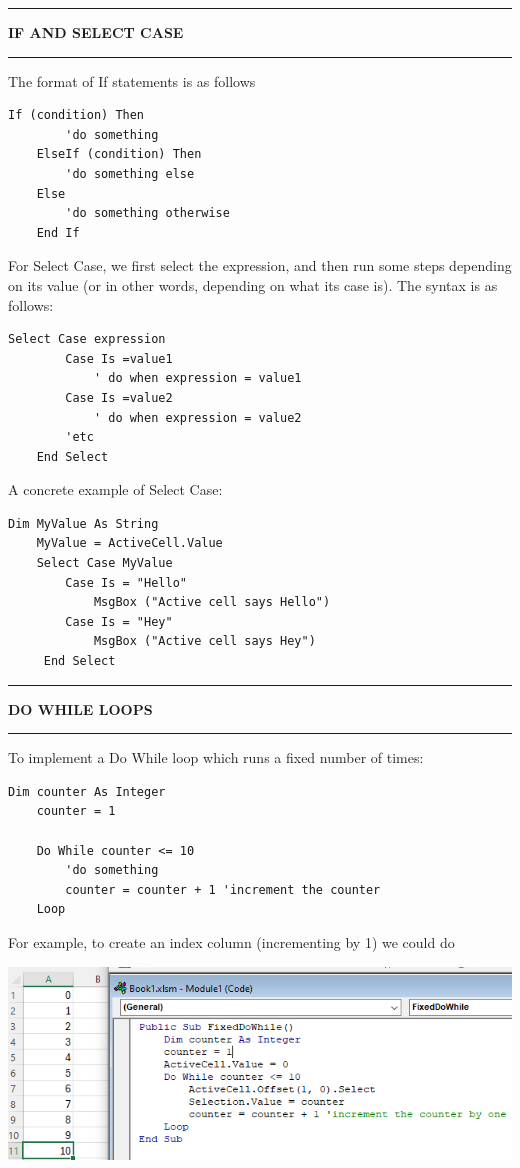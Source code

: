 \documentclass[8pt]{extarticle}
\newcommand{\heading}[1]{%
    \noindent
    \rule{\linewidth}{0.4pt}
    \begin{center}
        \vspace{-1ex}
        \textbf{#1}        
        \vspace{-2.5ex}
    \end{center}
    \rule{\linewidth}{0.4pt}
}
\begin{document}
\begin{multicols}{3}
\heading{IF AND SELECT CASE}

The format of If statements is as follows
\begin{lstlisting}[style=vba]
    If (condition) Then
        'do something
    ElseIf (condition) Then        
        'do something else
    Else
        'do something otherwise
    End If
\end{lstlisting}

For Select Case, we first select the expression, and then run some steps depending on its value (or in other words, depending on what its case is). The syntax is as follows:

\begin{lstlisting}[style=vba]
    Select Case expression
        Case Is =value1
            ' do when expression = value1      
        Case Is =value2
            ' do when expression = value2      
        'etc
    End Select        
\end{lstlisting}

A concrete example of Select Case: 
\begin{lstlisting}[style=vba]
    Dim MyValue As String
    MyValue = ActiveCell.Value
    Select Case MyValue
        Case Is = "Hello"
            MsgBox ("Active cell says Hello")
        Case Is = "Hey"
            MsgBox ("Active cell says Hey")
     End Select  
\end{lstlisting}

\heading{DO WHILE LOOPS}

To implement a Do While loop which runs a fixed number of times:

\begin{lstlisting}[style=vba]
    Dim counter As Integer
    counter = 1
    
    Do While counter <= 10
        'do something 
        counter = counter + 1 'increment the counter
    Loop
\end{lstlisting}

For example, to create an index column (incrementing by 1) we could do 
\begin{center}
    \includegraphics[width=\columnwidth]{images/FixedDoWhile.png}
\end{center}


\end{multicols}
\end{document}
